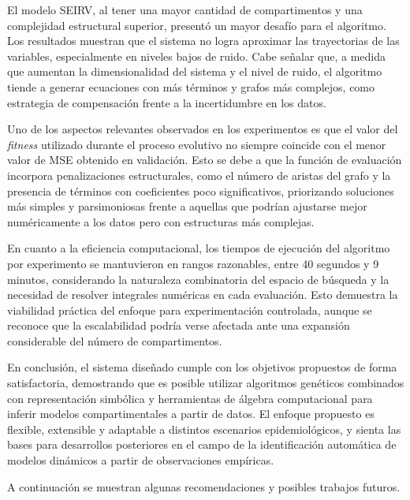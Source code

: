 \begin{conclusions}
El modelo SEIRV, al tener una mayor cantidad de compartimentos y una complejidad estructural superior, presentó un mayor desafío para el algoritmo. Los resultados muestran que el sistema no logra aproximar las trayectorias de las variables, especialmente en niveles bajos de ruido. Cabe señalar que, a medida que aumentan la dimensionalidad del sistema y el nivel de ruido, el algoritmo tiende a generar ecuaciones con más términos y grafos más complejos, como estrategia de compensación frente a la incertidumbre en los datos.

Uno de los aspectos relevantes observados en los experimentos es que el valor del \textit{fitness} utilizado durante el proceso evolutivo no siempre coincide con el menor valor de MSE obtenido en validación. Esto se debe a que la función de evaluación incorpora penalizaciones estructurales, como el número de aristas del grafo y la presencia de términos con coeficientes poco significativos, priorizando soluciones más simples y parsimoniosas frente a aquellas que podrían ajustarse mejor numéricamente a los datos pero con estructuras más complejas.

En cuanto a la eficiencia computacional, los tiempos de ejecución del algoritmo por experimento se mantuvieron en rangos razonables, entre 40 segundos y 9 minutos, considerando la naturaleza combinatoria del espacio de búsqueda y la necesidad de resolver integrales numéricas en cada evaluación. Esto demuestra la viabilidad práctica del enfoque para experimentación controlada, aunque se reconoce que la escalabilidad podría verse afectada ante una expansión considerable del número de compartimentos.

En conclusión, el sistema diseñado cumple con los objetivos propuestos de forma satisfactoria, demostrando que es posible utilizar algoritmos genéticos combinados con representación simbólica y herramientas de álgebra computacional para inferir modelos compartimentales a partir de datos. El enfoque propuesto es flexible, extensible y adaptable a distintos escenarios epidemiológicos, y sienta las bases para desarrollos posteriores en el campo de la identificación automática de modelos dinámicos a partir de observaciones empíricas.

A continuación se muestran algunas recomendaciones y posibles trabajos futuros.

\end{conclusions}
